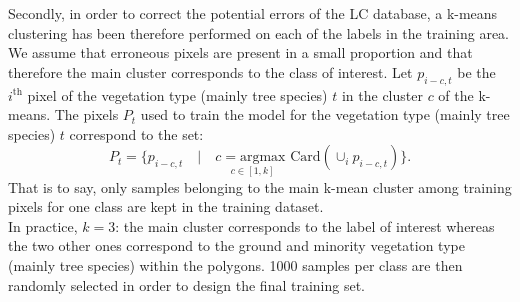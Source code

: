 Secondly, in order to correct the potential errors of the LC database, a k-means clustering has been therefore performed on each of the labels in the training area. We assume that erroneous pixels are present in a small proportion and that therefore the main cluster corresponds to the class of interest. Let $p_{i-c,t}$ be the $i^{\text{th}}$ pixel of the vegetation type (mainly tree species) $t$ in the cluster $c$ of the k-means. The pixels $P_{t}$ used to train the model for the vegetation type (mainly tree species) $t$ correspond to the set:
\begin{equation}
P_{t} = \{{p_{i-c,t} \quad | \quad \underset{c \in [1,k]}{c=\text{argmax }}\text{Card} ( \cup_{i} p_{i-c,t} ) } \}.
\end{equation}
That is to say, only samples belonging to the main k-mean cluster among training pixels for one class are kept in the training dataset. \\
In practice, $k=3$: the main cluster corresponds to the label of interest whereas the two other ones correspond to the ground and minority vegetation type (mainly tree species) within the polygons. 1000 samples per class are then randomly selected in order to design the final training set.

